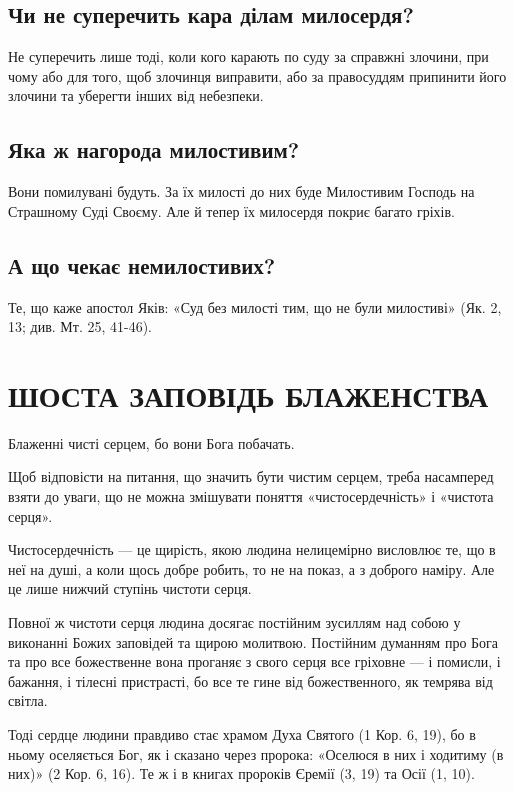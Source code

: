 \documentclass[main.tex]{subfiles}
\begin{document}
\subsection{Чи не суперечить кара ділам милосердя?}

Не суперечить лише тоді, коли кого карають по суду за справжні злочини, при чому або для того, щоб злочинця виправити, або за правосуддям припинити його злочини та уберегти інших від небезпеки.

\subsection{Яка ж нагорода милостивим?}

Вони помилувані будуть. За їх милості до них буде Милостивим Господь на Страшному Суді Своєму. Але й тепер їх милосердя покриє багато гріхів.

\subsection{А що чекає немилостивих?}

Те, що каже апостол Яків: «Суд без милості тим, що не були милостиві» (Як. 2, 13; див. Мт. 25, 41-46).

\section{ШОСТА ЗАПОВІДЬ БЛАЖЕНСТВА}

Блаженні чисті серцем, бо вони Бога побачать.

Щоб відповісти на питання, що значить бути чистим серцем, треба насамперед взяти до уваги, що не можна змішувати поняття «чистосердечність» і «чистота серця».
 
Чистосердечність — це щирість, якою людина нелицемірно висловлює те, що в неї на душі, а коли щось добре робить, то не на показ, а з доброго наміру. Але це лише нижчий ступінь чистоти серця.

Повної ж чистоти серця людина досягає постійним зусиллям над собою у виконанні Божих заповідей та щирою молитвою. Постійним думанням про Бога та про все божественне вона проганяє з свого серця все гріховне — і помисли, і бажання, і тілесні пристрасті, бо все те гине від божественного, як темрява від світла.

Тоді сердце людини правдиво стає храмом Духа Святого (1 Кор. 6, 19), бо в ньому оселяється Бог, як і сказано через пророка: «Оселюся в них і ходитиму (в них)» (2 Кор. 6, 16). Те ж і в книгах пророків Єремії (3, 19) та Осії (1, 10).
\end{document}
